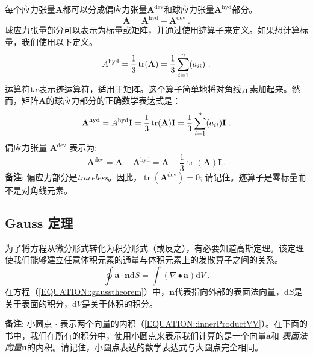 \documentclass[LBMDerivation.tex]{subfiles}
\begin{document}
	每个应力张量$\textbf{A}$都可以分成偏应力张量$\textbf{A}^\text{dev}$和球应力张量$\textbf{A}^\text{hyd}$部分。
%
%
\begin{equation}
  \textbf{A}
=
  \textbf{A}^\text{hyd}
+
  \textbf{A}^\text{dev}~.
  \label{EQUATION::deviatoricHydrostatic}
\end{equation}
%
%
	球应力张量部分可以表示为标量或矩阵，并通过使用迹算子来定义。如果想计算标量，我们使用以下定义。
%
%
\begin{equation}
  A^\mathrm{hyd}
=
  \frac{1}{3}\operatorname{tr}(\textbf{A})
=
  \frac{1}{3} \sum_{i=1}^{n}(a_{ii}) ~.
  \label{EQUATION::hydrostaticScalar}
\end{equation}
%
%
	运算符$\texttt{tr}$表示迹运算符，适用于矩阵。这个算子简单地将对角线元素加起来。然而，矩阵$\textbf{A}$的球应力部分的正确数学表达式是：
%
%
%
\begin{equation}
  \textbf{A}^\mathrm{hyd}
=
  A^\mathrm{hyd} \textbf{I}
=
  \frac{1}{3}\operatorname{tr}(\textbf{A})\textbf{I}
=
  \frac{1}{3} \sum_{i=1}^{n}(a_{ii})\textbf{I} ~.
  \label{EQUATION::hydrostaticMatrix}
\end{equation}
%
%
%
	偏应力张量 $\textbf{A}^\mathrm{dev}$ 表示为:
%
%
\begin{equation}
 \textbf{A}^\mathrm{dev}
=
 \textbf{A} - \textbf{A}^\mathrm{hyd}
=
 \textbf{A} - \frac{1}{3}\operatorname{tr}(\textbf{A})\textbf{I}~.
 \label{EQUATION::deviatoric}
\end{equation}
%
%
	\textbf{备注}: 偏应力部分是\textit{traceless}。因此，$\operatorname{tr}(\textbf{A}^\mathrm{dev}) = 0$; 请记住。迹算子是零标量而不是对角线元素。
	
%
%
%
%
%
\subsection{Gauss 定理}
%
%
	为了将方程从微分形式转化为积分形式（或反之），有必要知道高斯定理。该定理使我们能够建立任意体积元素的通量与体积元素上的发散算子之间的关系。
%
%
\begin{equation}
 \oint \textbf{a} \cdot \textbf{n} \mathrm{d}S
=
 \int (\nabla \bullet \textbf{a}) \mathrm{d}V~.
 \label{EQUATION::gausstheorem}
\end{equation}
%
%
	在方程（\ref{EQUATION::gausstheorem}）中，$\textbf{n}$代表指向外部的表面法向量，d$S$是关于表面的积分，d$V$是关于体积的积分。


	\textbf{备注}: 小圆点 $\cdot$ 	表示两个向量的内积（\ref{EQUATION::innerProductVV}）。在下面的书中，我们在所有的积分中，使用小圆点来表示我们计算的是一个向量\textbf{a}和 \textit{表面法向量}\textbf{n}的内积。请记住，小圆点表达的数学表达式与大圆点完全相同。
	


\end{document}
